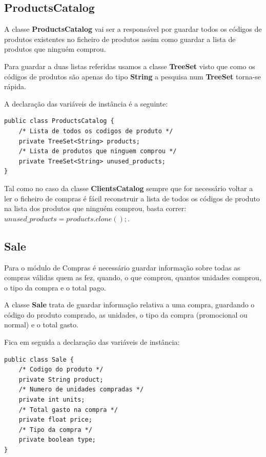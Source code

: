 \documentclass[10pt] {article}
\begin{document}
\subsection{ProductsCatalog}

A classe \textbf{ProductsCatalog} vai ser a responsável por guardar todos os códigos de produtos existentes no ficheiro de
produtos assim como guardar a lista de produtos que ninguém comprou.

Para guardar a duas listas referidas usamos a classe \textbf{TreeSet} visto que como os códigos de produtos são apenas
do tipo \textbf{String} a pesquisa num \textbf{TreeSet} torna-se rápida.

A declaração das variáveis de instância é a seguinte:

\begin{lstlisting}
public class ProductsCatalog {
	/* Lista de todos os codigos de produto */
	private TreeSet<String> products;
	/* Lista de produtos que ninguem comprou */
	private TreeSet<String> unused_products;
}
\end{lstlisting}


Tal como no caso da classe \textbf{ClientsCatalog} sempre que for necessário voltar a ler o ficheiro de compras é fácil
reconstruir a lista de todos os códigos de produto na lista dos produtos que ninguém comprou, basta correr:
$unused\_products = products.clone();$.

\newpage
\subsection{Sale}

Para o módulo de Compras é necessário guardar informação sobre todas as compras válidas quem as fez, quando,
o que comprou, quantos unidades comprou, o tipo da compra e o total pago.

A classe \textbf{Sale} trata de guardar informação relativa a uma compra, guardando o código do produto comprado,
as unidades, o tipo da compra (promocional ou normal) e o total gasto.

Fica em seguida a declaração das variáveis de instância:

\begin{lstlisting}
public class Sale {
	/* Codigo do produto */
	private String product;
	/* Numero de unidades compradas */
	private int units;
	/* Total gasto na compra */
	private float price;
	/* Tipo da compra */
	private boolean type;
}
\end{lstlisting}
\end{document}
